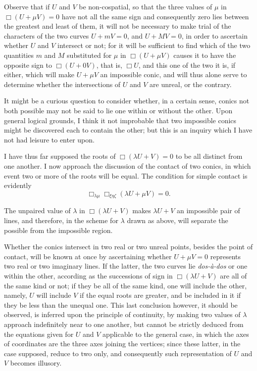 \documentclass[11pt]{article}
\newcommand{\sourcepage}[1]{\marginpar{\scriptsize p.~#1}}
\begin{document}
\sourcepage{128}
Observe that if $U$ and $V$ be non-cospatial, so that the three values of $\mu$ in $\Box(U+\mu V)=0$ have not all the same sign and consequently zero lies between the greatest and least of them, it will not be necessary to make trial of the characters of the two curves $U+mV=0$, and $U+MV=0$, in order to ascertain whether $U$ and $V$ intersect or not; for it will be sufficient to find which of the two quantities $m$ and $M$ substituted for $\mu$ in $\Box(U+\mu V)$ causes it to have the opposite sign to $\Box(U+0V)$, that is, $\Box U$, and this one of the two it is, if either, which will make $U+\mu V$ an impossible conic, and will thus alone serve to determine whether the intersections of $U$ and $V$ are unreal, or the contrary.

It might be a curious question to consider whether, in a certain sense, conics not both possible may not be said to lie one within or without the other. Upon general logical grounds, I think it not improbable that two impossible conics might be discovered each to contain the other; but this is an inquiry which I have not had leisure to enter upon.

I have thus far supposed the roots of $\Box(\lambda U+V)=0$ to be all distinct from one another. I now approach the discussion of the contact of two conics, in which event two or more of the roots will be equal. The condition for simple contact is evidently
\[
\Box_{\lambda\mu}\Box_{\xi\eta\zeta}(\lambda U+\mu V)=0.
\]

The unpaired value of $\lambda$ in $\Box(\lambda U+V)$ makes $\lambda U+V$ an impossible pair of lines, and therefore, in the scheme for $\lambda$ drawn as above, will separate the possible from the impossible region.

Whether the conics intersect in two real or two unreal points, besides the point of contact, will be known at once by ascertaining whether $U+\mu V=0$ represents two real or two imaginary lines. If the latter, the two curves lie \emph{dos-\`a-dos} or one within the other, according as the successions of sign in $\Box(\lambda U+V)$ are all of the same kind or not; if they be all of the same kind, one will include the other, namely, $U$ will include $V$ if the equal roots are greater, and be included in it if they be less than the unequal one. This last conclusion however, it should be observed, is inferred upon the principle of continuity, by making two values of $\lambda$ approach indefinitely near to one another, but cannot be strictly deduced from the equations given for $U$ and $V$ applicable to the general case, in which the axes of coordinates are the three axes joining the vertices; since these latter, in the case supposed, reduce to two only, and consequently such representation of $U$ and $V$ becomes illusory.
\end{document}
